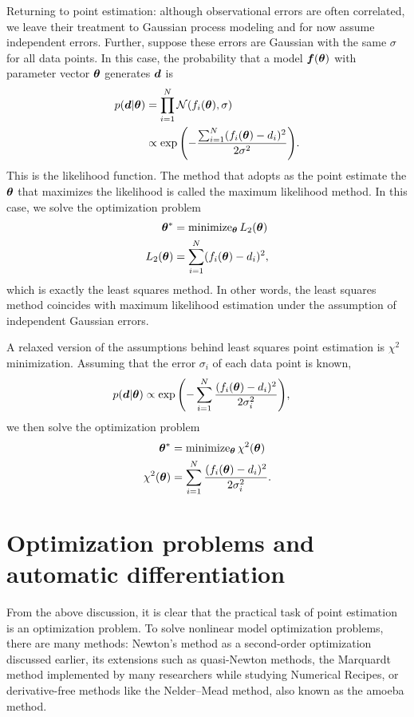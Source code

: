 Returning to point estimation: although observational errors are often correlated, we leave their treatment to Gaussian process modeling and for now assume independent errors. Further, suppose these errors are Gaussian with the same $\sigma$ for all data points. In this case, the probability that a model $\boldsymbol{f}(\boldsymbol{\theta})$ with parameter vector $\boldsymbol{\theta}$ generates $\boldsymbol{d}$ is
\begin{align}
p(\boldsymbol{d}|\boldsymbol{\theta}) &= \prod_{i=1}^N \mathcal{N} (f_i(\boldsymbol{\theta}), \sigma ) \\
&\propto \exp{\left( - \dfrac{\sum_{i=1}^N (f_i(\boldsymbol{\theta}) - d_i)^2 }{2 \sigma^2}\right)} .
\end{align}
This is the likelihood function. The method that adopts as the point estimate the $\boldsymbol{\theta}$ that maximizes the likelihood is called the maximum likelihood method. In this case, we solve the optimization problem
\begin{align}
\boldsymbol{\theta}^\ast &= \mathrm{minimize}_{\boldsymbol{\theta}} \, L_2(\boldsymbol{\theta}) \\
L_2(\boldsymbol{\theta}) &= \sum_{i=1}^N (f_i(\boldsymbol{\theta}) - d_i)^2 ,
\end{align}
which is exactly the least squares method. In other words, the least squares method coincides with maximum likelihood estimation under the assumption of independent Gaussian errors.

A relaxed version of the assumptions behind least squares point estimation is $\chi^2$ minimization. Assuming that the error $\sigma_i$ of each data point is known,
\begin{align}
p(\boldsymbol{d}|\boldsymbol{\theta}) &\propto \exp{\left( - \sum_{i=1}^N \dfrac{ (f_i(\boldsymbol{\theta}) - d_i)^2 }{2 \sigma_i^2}\right)} ,
\end{align}
we then solve the optimization problem
\begin{align}
\boldsymbol{\theta}^\ast &= \mathrm{minimize}_{\boldsymbol{\theta}} \, \chi^2(\boldsymbol{\theta}) \\
\chi^2(\boldsymbol{\theta}) &= \sum_{i=1}^N \dfrac{ (f_i(\boldsymbol{\theta}) - d_i)^2 }{2 \sigma_i^2} .
\end{align}


\section{Optimization problems and automatic differentiation}

From the above discussion, it is clear that the practical task of point estimation is an optimization problem. To solve nonlinear model optimization problems, there are many methods: Newton's method as a second-order optimization discussed earlier, its extensions such as quasi-Newton methods, the Marquardt method implemented by many researchers while studying Numerical Recipes, or derivative-free methods like the Nelder–Mead method, also known as the amoeba method.

